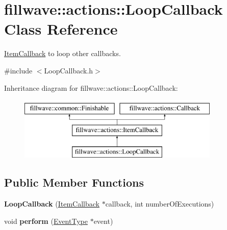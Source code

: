 \hypertarget{classfillwave_1_1actions_1_1LoopCallback}{}\section{fillwave\+:\+:actions\+:\+:Loop\+Callback Class Reference}
\label{classfillwave_1_1actions_1_1LoopCallback}


\hyperlink{classfillwave_1_1actions_1_1ItemCallback}{Item\+Callback} to loop other callbacks.  




{\ttfamily \#include $<$Loop\+Callback.\+h$>$}

Inheritance diagram for fillwave\+:\+:actions\+:\+:Loop\+Callback\+:\begin{figure}[H]
\begin{center}
\leavevmode
\includegraphics[height=3.000000cm]{classfillwave_1_1actions_1_1LoopCallback}
\end{center}
\end{figure}
\subsection*{Public Member Functions}
\begin{DoxyCompactItemize}
\item 
\hypertarget{classfillwave_1_1actions_1_1LoopCallback_a45b4882a85854a47be1e314c7e9d574b}{}{\bfseries Loop\+Callback} (\hyperlink{classfillwave_1_1actions_1_1ItemCallback}{Item\+Callback} $\ast$callback, int number\+Of\+Executions)\label{classfillwave_1_1actions_1_1LoopCallback_a45b4882a85854a47be1e314c7e9d574b}

\item 
\hypertarget{classfillwave_1_1actions_1_1LoopCallback_ad6f861647fddcd3391d3acc0653f292a}{}void {\bfseries perform} (\hyperlink{classfillwave_1_1actions_1_1EventType}{Event\+Type} $\ast$event)\label{classfillwave_1_1actions_1_1LoopCallback_ad6f861647fddcd3391d3acc0653f292a}

\end{DoxyCompactItemize}
